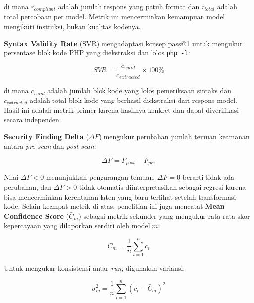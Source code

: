     di mana $r_{compliant}$ adalah jumlah respons yang patuh format dan
    $r_{total}$ adalah total percobaan per model. Metrik ini mencerminkan
    kemampuan model mengikuti instruksi, bukan kualitas kodenya.

    \textbf{Syntax Validity Rate} (SVR) mengadaptasi konsep pass@1
    \cite{roziere2024codellama}\cite{hui2024qwen} untuk mengukur persentase
    blok kode PHP yang diekstraksi dan lolos \texttt{php -l}:

    \begin{equation}
        SVR = \frac{c_{valid}}{c_{extracted}} \times 100\%
        \label{eq:svr}
    \end{equation}

    di mana $c_{valid}$ adalah jumlah blok kode yang lolos pemeriksaan
    sintaks dan $c_{extracted}$ adalah total blok kode yang berhasil
    diekstraksi dari respons model. Hasil ini adalah metrik primer karena
    hasilnya konkret dan dapat diverifikasi secara independen.

    \textbf{Security Finding Delta} ($\Delta F$) mengukur perubahan
    jumlah temuan keamanan antara \textit{pre-scan} dan \textit{post-scan}:

    \begin{equation}
        \Delta F = F_{post} - F_{pre}
        \label{eq:deltaf}
    \end{equation}

    Nilai $\Delta F < 0$ menunjukkan pengurangan temuan, $\Delta F = 0$
    berarti tidak ada perubahan, dan $\Delta F > 0$ tidak otomatis
    diinterpretasikan sebagai regresi karena bisa mencerminkan kerentanan
    laten yang baru terlihat setelah transformasi kode.
    Selain keempat metrik di atas, penelitian ini juga mencatat
    \textbf{Mean Confidence Score} ($\bar{C}_m$) sebagai metrik sekunder
    yang mengukur rata-rata skor kepercayaan yang dilaporkan sendiri oleh
    model $m$:

    \begin{equation}
        \bar{C}_m = \frac{1}{n} \sum_{i=1}^{n} c_i
        \label{eq:conf-mean}
    \end{equation}

    Untuk mengukur konsistensi antar \textit{run}, digunakan variansi:

    \begin{equation}
        \sigma^2_m = \frac{1}{n} \sum_{i=1}^{n} (c_i - \bar{C}_m)^2
        \label{eq:conf-var}
    \end{equation}

